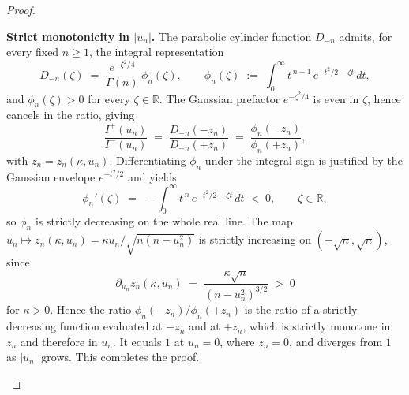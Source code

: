 \documentclass[12pt, a4paper]{report}
\newcommand{\dd}{\,\mathrm{d}}
\newcommand{\1}{\mathbf{1}}
\begin{document}
\begin{proof}
\begin{enumerate}

\textbf{Strict monotonicity in $|u_n|$.} The parabolic cylinder function 
$D_{-n}$ admits, for every fixed $n \geq 1$, the integral representation
\[
  D_{-n}(\zeta) \;=\; \frac{e^{-\zeta^{2}/4}}{\Gamma(n)}\, \phi_n(\zeta),
  \qquad
  \phi_n(\zeta) \;:=\; \int_{0}^{\infty} t^{\,n-1}\, e^{-t^{2}/2 - \zeta t}\, dt,
\]
and $\phi_n(\zeta) > 0$ for every $\zeta \in \mathbb{R}$. The Gaussian
prefactor $e^{-\zeta^{2}/4}$ is even in $\zeta$, hence cancels in the ratio, giving
\[
  \frac{I^{+}(u_n)}{I^{-}(u_n)}
  \;=\;
  \frac{D_{-n}(-z_n)}{D_{-n}(+z_n)}
  \;=\;
  \frac{\phi_n(-z_n)}{\phi_n(+z_n)},
\]
with $z_n = z_n(\kappa, u_n)$. Differentiating $\phi_n$ under the integral 
sign is justified by the Gaussian envelope $e^{-t^{2}/2}$ and yields
\[
  \phi_n'(\zeta)
  \;=\;
  -\int_{0}^{\infty} t^{\,n}\, e^{-t^{2}/2 - \zeta t}\, dt
  \;<\; 0,
  \qquad \zeta \in \mathbb{R},
\]
so $\phi_n$ is strictly decreasing on the whole real line. The map 
$u_n \mapsto z_n(\kappa, u_n) = \kappa u_n / \sqrt{n(n - u_n^{2})}$ is 
strictly increasing on $(-\sqrt{n}, \sqrt{n})$, since
\[
  \partial_{u_n} z_n(\kappa, u_n)
  \;=\;
  \frac{\kappa \sqrt{n}}{(n - u_n^{2})^{3/2}}
  \;>\; 0
\]
for $\kappa > 0$. Hence the ratio $\phi_n(-z_n)/\phi_n(+z_n)$ is the ratio 
of a strictly decreasing function evaluated at $-z_n$ and at $+z_n$, 
which is strictly monotone in $z_n$ and therefore in $u_n$. It equals $1$ 
at $u_n = 0$, where $z_n = 0$, and diverges from $1$ as $|u_n|$ grows. 
This completes the proof.



\end{enumerate}
\end{proof}
\end{document}
